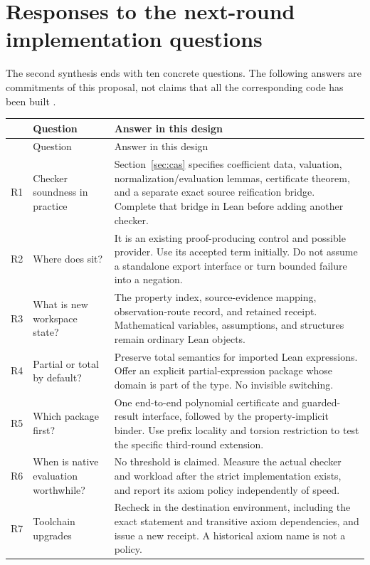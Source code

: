 \documentclass[11pt,a4paper]{article}
\newcommand{\code}[1]{\texttt{\detokenize{#1}}}
\theoremstyle{plain}
\theoremstyle{definition}
\begin{document}
\section{Responses to the next-round implementation questions}\label{sec:questions}

The second synthesis ends with ten concrete questions. The following answers are commitments of this proposal, not claims that all the corresponding code has been built \cite{synB}.
\begin{center}\small
\begin{longtable}{@{}L{10mm}L{43mm}L{98mm}@{}}
\toprule
 & Question & Answer in this design\\
\midrule\endfirsthead
\toprule & Question & Answer in this design\\\midrule\endhead
R1 & Checker soundness in practice & Section~\ref{sec:cas} specifies coefficient data, valuation, normalization/evaluation lemmas, certificate theorem, and a separate exact source reification bridge. Complete that bridge in Lean before adding another checker.\\
R2 & Where does \code{grobner} sit? & It is an existing proof-producing control and possible provider. Use its accepted term initially. Do not assume a standalone export interface or turn bounded failure into a negation.\\
R3 & What is new workspace state? & The property index, source-evidence mapping, observation-route record, and retained receipt. Mathematical variables, assumptions, and structures remain ordinary Lean objects.\\
R4 & Partial or total by default? & Preserve total semantics for imported Lean expressions. Offer an explicit partial-expression package whose domain is part of the type. No invisible switching.\\
R5 & Which package first? & One end-to-end polynomial certificate and guarded-result interface, followed by the property-implicit binder. Use prefix locality and torsion restriction to test the specific third-round extension.\\
R6 & When is native evaluation worthwhile? & No threshold is claimed. Measure the actual checker and workload after the strict implementation exists, and report its axiom policy independently of speed.\\
R7 & Toolchain upgrades & Recheck in the destination environment, including the exact statement and transitive axiom dependencies, and issue a new receipt. A historical axiom name is not a policy.\\

\end{longtable}
\end{center}
\end{document}
